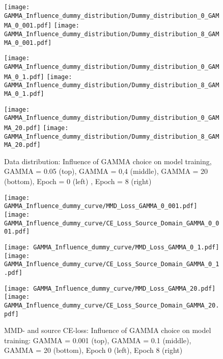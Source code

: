 \begin{figure}[H]
  \centering
  \texttt{[image: GAMMA\_Influence\_dummy\_distribution/Dummy\_distribution\_0\_GAMMA\_0\_001.pdf]}
  \hspace{.4cm}
  \texttt{[image: GAMMA\_Influence\_dummy\_distribution/Dummy\_distribution\_8\_GAMMA\_0\_001.pdf]}

  \vspace{.1cm}

  \texttt{[image: GAMMA\_Influence\_dummy\_distribution/Dummy\_distribution\_0\_GAMMA\_0\_1.pdf]}
  \hspace{.4cm}
  \texttt{[image: GAMMA\_Influence\_dummy\_distribution/Dummy\_distribution\_8\_GAMMA\_0\_1.pdf]}

  \vspace{.1cm}

  \texttt{[image: GAMMA\_Influence\_dummy\_distribution/Dummy\_distribution\_0\_GAMMA\_20.pdf]}
  \hspace{.4cm}
  \texttt{[image: GAMMA\_Influence\_dummy\_distribution/Dummy\_distribution\_8\_GAMMA\_20.pdf]}
 

  \caption{Data distribution: Influence of GAMMA choice on model training, GAMMA = 0.05 (top), GAMMA = 0,4 (middle), GAMMA = 20 (bottom), Epoch = 0 (left) , Epoch = 8 (right)}
  \label{fig:point_cloud_mmd}
\end{figure}


\begin{figure}[H]
  \centering
  \texttt{[image: GAMMA\_Influence\_dummy\_curve/MMD\_Loss\_GAMMA\_0\_001.pdf]}
  \hspace{.3cm}
  \texttt{[image: GAMMA\_Influence\_dummy\_curve/CE\_Loss\_Source\_Domain\_GAMMA\_0\_001.pdf]}

  \vspace{.1cm}

  \texttt{[image: GAMMA\_Influence\_dummy\_curve/MMD\_Loss\_GAMMA\_0\_1.pdf]}
  \hspace{.3cm}
  \texttt{[image: GAMMA\_Influence\_dummy\_curve/CE\_Loss\_Source\_Domain\_GAMMA\_0\_1.pdf]}

  \vspace{.1cm}

  \texttt{[image: GAMMA\_Influence\_dummy\_curve/MMD\_Loss\_GAMMA\_20.pdf]}
  \hspace{.1cm}
  \texttt{[image: GAMMA\_Influence\_dummy\_curve/CE\_Loss\_Source\_Domain\_GAMMA\_20.pdf]}

  \caption{MMD- and source CE-loss: Influence of GAMMA choice on model training: GAMMA = 0.001 (top), GAMMA = 0.1 (middle), GAMMA = 20 (bottom), Epoch 0 (left), Epoch 8 (right)}
  \label{fig:learning_curves_influence_mmd_feature_extractor}
\end{figure}

